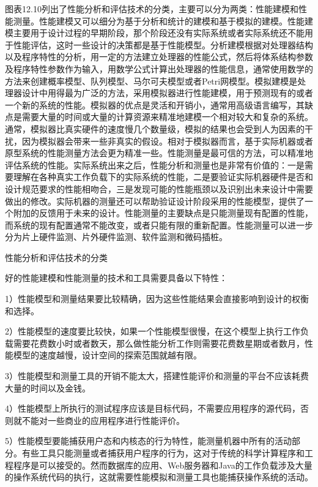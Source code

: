 \documentclass[]{ctexbook}
\begin{document}
图表12.10列出了性能分析和评估技术的分类，主要可以分为两类：性能建模和性能测量。性能建模又可以细分为基于分析和统计的建模和基于模拟的建模。性能建模主要用于设计过程的早期阶段，那个阶段还没有实际系统或者实际系统还不能用于性能评估，这时一些设计的决策都是基于性能模型。分析建模根据对处理器结构以及程序特性的分析，用一定的方法建立处理器的性能公式，然后将体系结构参数及程序特性参数作为输入，用数学公式计算出处理器的性能信息，通常使用数学的方法来创建概率模型、队列模型、马尔可夫模型或者Petri网模型。模拟建模是处理器设计中用得最为广泛的方法，采用模拟器进行性能建模，用于预测现有的或者一个新的系统的性能。模拟器的优点是灵活和开销小，通常用高级语言编写，其缺点是需要大量的时间或大量的计算资源来精准地建模一个相对较大和复杂的系统。通常，模拟器比真实硬件的速度慢几个数量级，模拟的结果也会受到人为因素的干扰，因为模拟器会带来一些非真实的假设。相对于模拟器而言，基于实际机器或者原型系统的性能测量方法会更为精准一些。性能测量是最可信的方法，可以精准地评估系统的性能。实际系统出来之后，性能分析和测量也是非常有价值的：一是需要理解在各种真实工作负载下的实际系统的性能，二是要验证实际机器硬件是否和设计规范要求的性能相吻合，三是发现可能的性能瓶颈以及识别出未来设计中需要做出的修改。实际机器的测量还可以帮助验证设计阶段采用的性能模型，提供了一个附加的反馈用于未来的设计。性能测量的主要缺点是只能测量现有配置的性能，而系统的现有配置通常不能改变，或者只能有限的重新配置。性能测量可以进一步分为片上硬件监测、片外硬件监测、软件监测和微码插桩。

\label{tab:perf-eval-class}性能分析和评估技术的分类

好的性能建模和性能测量的技术和工具需要具备以下特性：

1）性能模型和测量结果要比较精确，因为这些性能结果会直接影响到设计的权衡和选择。

2）性能模型的速度要比较快，如果一个性能模型很慢，在这个模型上执行工作负载需要花费数小时或者数天，那么做性能分析工作则需要花费数星期或者数月，性能模型的速度越慢，设计空间的探索范围就越有限。

3）性能模型和测量工具的开销不能太大，搭建性能评价和测量的平台不应该耗费大量的时间以及金钱。

4）性能模型上所执行的测试程序应该是目标代码，不需要应用程序的源代码，否则就不能对一些商业的应用程序进行性能评价。

5）性能模型要能捕获用户态和内核态的行为特性，能测量机器中所有的活动部分。有些工具只能测量或者捕获用户程序的行为，这对于传统的科学计算程序和工程程序是可以接受的。然而数据库的应用、Web服务器和Java的工作负载涉及大量的操作系统代码的执行，这就需要性能模拟和测量工具也能捕获操作系统的活动。
\end{document}
